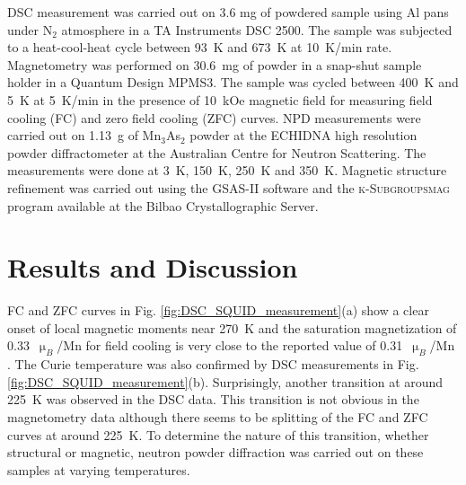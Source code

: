 \documentclass[letterpaper,10pt,doublespacing,edeposit]{uiucthesis2020}
\begin{document}
\begin{mainmatter}
DSC measurement was carried out on 3.6 mg of powdered sample using Al pans under N$_2$ atmosphere in a TA Instruments DSC 2500. The sample was subjected to a heat-cool-heat cycle between 93~K and 673~K at 10~K/min rate.
Magnetometry was performed on 30.6~mg of powder in a snap-shut sample holder in a Quantum Design MPMS3. The sample was cycled between 400~K and 5~K at 5~K/min in the presence of 10~kOe magnetic field for measuring field cooling (FC) and zero field cooling (ZFC) curves. NPD measurements were carried out on 1.13~g of Mn$_3$As$_2$ powder at the \textsc{ECHIDNA} high resolution powder diffractometer \cite{Avdeev2018} at the Australian Centre for Neutron Scattering. The measurements were done at 3~K, 150~K, 250~K and 350~K. Magnetic structure refinement was carried out using the \textsc{GSAS-II} software \cite{Toby:aj5212} and the \textsc{k-Subgroupsmag} program \cite{Perez-Mato2015} available at the Bilbao Crystallographic Server.



\section{Results and Discussion}


FC and ZFC curves in Fig. \ref{fig:DSC_SQUID_measurement}(a) show a clear onset of local magnetic moments near 270~K and the saturation magnetization of 0.33~$\upmu_B$/Mn for field cooling is very close to the reported value of 0.31~$\upmu_B$/Mn \cite{Yuzuri1960}. The Curie temperature was also confirmed by DSC measurements in Fig. \ref{fig:DSC_SQUID_measurement}(b). Surprisingly, another transition at around 225~K was observed in the DSC data. This transition is not obvious in the magnetometry data although there seems to be splitting of the FC and ZFC curves at around 225~K. To determine the nature of this transition, whether structural or magnetic, neutron powder diffraction was carried out on these samples at varying temperatures.


\end{mainmatter}
\end{document}

